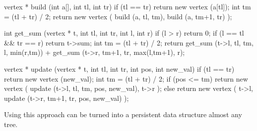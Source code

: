 vertex * build (int a[], int tl, int tr) {
if (tl == tr)
return new vertex (a[tl]);
int tm = (tl + tr) / 2;
return new vertex (
build (a, tl, tm),
build (a, tm+1, tr)
);
}

int get_sum (vertex * t, int tl, int tr, int l, int r) {
if (l > r)
return 0;
if (l == tl && tr == r)
return t->sum;
int tm = (tl + tr) / 2;
return get_sum (t->l, tl, tm, l, min(r,tm))
+ get_sum (t->r, tm+1, tr, max(l,tm+1), r);
}

vertex * update (vertex * t, int tl, int tr, int pos, int new_val) {
if (tl == tr)
return new vertex (new_val);
int tm = (tl + tr) / 2;
if (pos <= tm)
return new vertex (
update (t->l, tl, tm, pos, new_val),
t->r
);
else
return new vertex (
t->l,
update (t->r, tm+1, tr, pos, new_val)
);
}
\endcode

Using this approach can be turned into a persistent data structure almost any tree.
